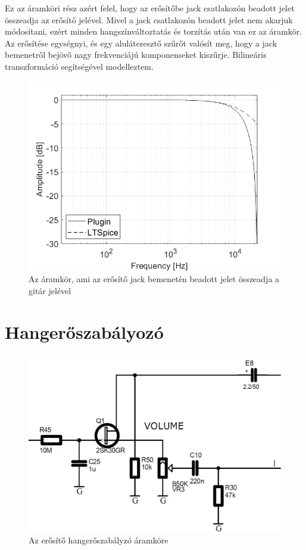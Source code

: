 Ez az áramköri rész azért felel, hogy az erősítőbe jack csatlakozón beadott jelet összeadja az erősítő jelével. Mivel a jack csatlakozón beadott jelet nem akarjuk módosítani, ezért minden hangszínváltoztatás és torzítás után van ez az áramkör. Az erősítése egységnyi, és egy aluláteresztő szűrőt valósít meg, hogy a jack bemenetről bejövő nagy frekvenciájú komponenseket kiszűrje. Bilineáris transzformáció segítségével modelleztem.
\begin{figure}[H]
    \centering
    \includegraphics[scale=0.5]{figures/stage6ac2.png}
    \caption{Az áramkör, ami az erősítő jack bemenetén beadott jelet összeadja a gitár jelével}
\end{figure}

\section{Hangerőszabályozó}

\begin{figure}[H]
    \centering
    \includegraphics[scale=0.45]{figures/stage7.png}
    \caption{Az erősítő hangerőszabályzó áramköre}
\end{figure}

